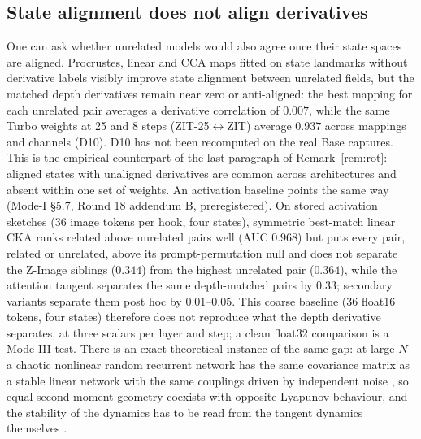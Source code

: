 \documentclass[11pt]{article}
\theoremstyle{definition}
\newcommand{\TT}{ZIT-25}%
\begin{document}
\subsection{State alignment does not align derivatives}
One can ask whether unrelated models would also agree once their state spaces are aligned. Procrustes, linear and CCA maps fitted on state landmarks without derivative labels visibly improve state alignment between unrelated fields, but the matched depth derivatives remain near zero or anti-aligned: the best mapping for each unrelated pair averages a derivative correlation of $0.007$, while the same Turbo weights at 25 and 8 steps (\TT{}$\leftrightarrow$ZIT) average $0.937$ across mappings and channels (D10). D10 has not been recomputed on the real Base captures. This is the empirical counterpart of the last paragraph of Remark~\ref{rem:rot}: aligned states with unaligned derivatives are common across architectures and absent within one set of weights. An activation baseline points the same way (Mode-I \S5.7, Round 18 addendum B, preregistered). On stored activation sketches (36 image tokens per hook, four states), symmetric best-match linear CKA ranks related above unrelated pairs well (AUC $0.968$) but puts every pair, related or unrelated, above its prompt-permutation null and does not separate the Z-Image siblings ($0.344$) from the highest unrelated pair ($0.364$), while the attention tangent separates the same depth-matched pairs by $0.33$; secondary variants separate them post hoc by $0.01$--$0.05$. This coarse baseline (36 float16 tokens, four states) therefore does not reproduce what the depth derivative separates, at three scalars per layer and step; a clean float32 comparison is a Mode-III test. There is an exact theoretical instance of the same gap: at large $N$ a chaotic nonlinear random recurrent network has the same covariance matrix as a stable linear network with the same couplings driven by independent noise \citep{shen2025covariance,clark2026linear}, so equal second-moment geometry coexists with opposite Lyapunov behaviour, and the stability of the dynamics has to be read from the tangent dynamics themselves \citep{clark2026lyapunov}.
\end{document}
